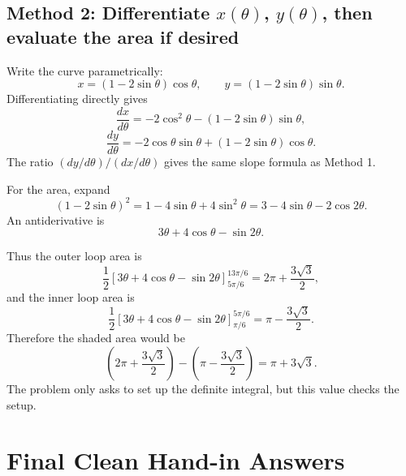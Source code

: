 \documentclass[a4paper,12pt]{article}
\newcommand{\method}[1]{%
  \Needspace{5\baselineskip}%
  \subsection*{Method #1}%
}
\begin{document}
\method{2: Differentiate \(x(\theta)\), \(y(\theta)\), then evaluate the area if desired}

\begin{steps}
\item Write the curve parametrically:
\[
  x=(1-2\sin\theta)\cos\theta,\qquad
  y=(1-2\sin\theta)\sin\theta.
\]
Differentiating directly gives
\[
  \frac{dx}{d\theta}
  =
  -2\cos^2\theta-(1-2\sin\theta)\sin\theta,
\]
\[
  \frac{dy}{d\theta}
  =
  -2\cos\theta\sin\theta+(1-2\sin\theta)\cos\theta.
\]
The ratio \((dy/d\theta)/(dx/d\theta)\) gives the same slope formula as Method 1.

\item For the area, expand
\[
  (1-2\sin\theta)^2
  =1-4\sin\theta+4\sin^2\theta
  =3-4\sin\theta-2\cos2\theta.
\]
An antiderivative is
\[
  3\theta+4\cos\theta-\sin2\theta.
\]

\item Thus the outer loop area is
\[
  \frac12\left[3\theta+4\cos\theta-\sin2\theta\right]_{5\pi/6}^{13\pi/6}
  =2\pi+\frac{3\sqrt3}{2},
\]
and the inner loop area is
\[
  \frac12\left[3\theta+4\cos\theta-\sin2\theta\right]_{\pi/6}^{5\pi/6}
  =\pi-\frac{3\sqrt3}{2}.
\]
Therefore the shaded area would be
\[
  \left(2\pi+\frac{3\sqrt3}{2}\right)
  -
  \left(\pi-\frac{3\sqrt3}{2}\right)
  =
  \pi+3\sqrt3.
\]
The problem only asks to set up the definite integral, but this value checks the setup.
\end{steps}

\newpage
\section*{Final Clean Hand-in Answers}
\end{document}
